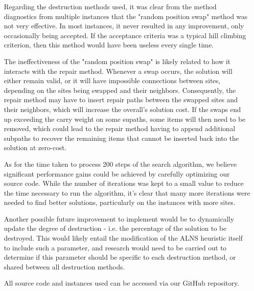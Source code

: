\documentclass[conference]{IEEEtran}
\begin{document}
Regarding the destruction methods used, it was clear from the method diagnostics from multiple instances that the "random position swap" method was not very effective. In most instances, it never resulted in any improvement, only occasionally being accepted. If the acceptance criteria was a typical hill climbing criterion, then this method would have been useless every single time.

The ineffectiveness of the "random position swap" is likely related to how it interacts with the repair method. Whenever a swap occurs, the solution will either remain valid, or it will have impossible connections between sites, depending on the sites being swapped and their neighbors. Consequently, the repair method may have to insert repair paths between the swapped sites and their neighbors, which will increase the overall's solution cost. If the swaps end up exceeding the carry weight on some supaths, some items will then need to be removed, which could lead to the repair method having to append additional subpaths to recover the remaining items that cannot be inserted back into the solution at zero-cost.

As for the time taken to process 200 steps of the search algorithm, we believe significant performance gains could be achieved by carefully optimizing our source code. While the number of iterations was kept to a small value to reduce the time necessary to run the algorithm, it's clear that many more iterations were needed to find better solutions, particularly on the instances with more sites.

Another possible future improvement to implement would be to dynamically update the degree of destruction - i.e. the percentage of the solution to be destroyed. This would likely entail the modification of the ALNS heuristic itself to include such a parameter, and research would need to be carried out to determine if this parameter should be specific to each destruction method, or shared between all destruction methods.

All source code and instances used can be accessed via our GitHub repository\cite{github}.



\end{document}
